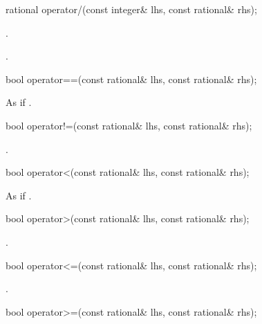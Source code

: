\begin{itemdecl}
rational operator/(const integer& lhs, const rational& rhs);
\end{itemdecl}

\begin{itemdescr}
\requires {}.

\returns {}.
\end{itemdescr}

\begin{itemdecl}
bool operator==(const rational& lhs, const rational& rhs);
\end{itemdecl}

\begin{itemdescr}
\returns As if .
\end{itemdescr}

\begin{itemdecl}
bool operator!=(const rational& lhs, const rational& rhs);
\end{itemdecl}

\begin{itemdescr}
\returns {}.
\end{itemdescr}

\begin{itemdecl}
bool operator<(const rational& lhs, const rational& rhs);
\end{itemdecl}

\begin{itemdescr}
\returns As if .
\end{itemdescr}

\begin{itemdecl}
bool operator>(const rational& lhs, const rational& rhs);
\end{itemdecl}

\begin{itemdescr}
\returns {}.
\end{itemdescr}

\begin{itemdecl}
bool operator<=(const rational& lhs, const rational& rhs);
\end{itemdecl}

\begin{itemdescr}
\returns {}.
\end{itemdescr}

\begin{itemdecl}
bool operator>=(const rational& lhs, const rational& rhs);
\end{itemdecl}

